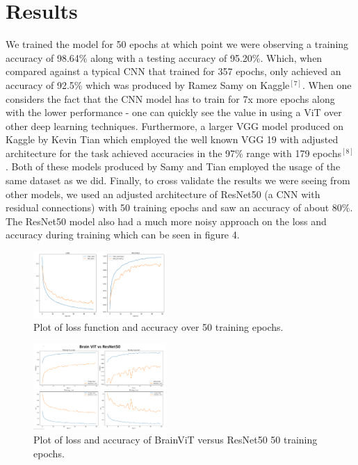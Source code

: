 \documentclass[conference]{IEEEtran}
\begin{document}
\section{Results}
We trained the model for 50 epochs at which point we were observing a training accuracy of 98.64\% along with a testing accuracy of 95.20\%. Which, when compared against a typical CNN that trained for 357 epochs, only achieved an accuracy of 92.5\% which was produced by Ramez Samy on Kaggle$^{[7]}$. When one considers the fact that the CNN model has to train for 7x more epochs along with the lower performance - one can quickly see the value in using a ViT over other deep learning techniques. Furthermore, a larger VGG model produced on Kaggle by Kevin Tian which employed the well known VGG 19 with adjusted architecture for the task achieved accuracies in the 97\% range with 179 epochs$^{[8]}$. Both of these models produced by Samy and Tian employed the usage of the same dataset as we did. Finally, to cross validate the results we were seeing from other models, we used an adjusted architecture of ResNet50 (a CNN with residual connections) with 50 training epochs and saw an accuracy of about 80\%. The ResNet50 model also had a much more noisy approach on the loss and accuracy during training which can be seen in figure 4.

\begin{figure}[htbp]
    \centering
    \includegraphics[width=0.45\textwidth]{lossacc over 50 epochs.PNG}
    \caption{Plot of loss function and accuracy over 50 training epochs.}
    \label{fig:2}
\end{figure}

\begin{figure}[htbp]
    \centering
    \includegraphics[width=0.45\textwidth]{resnet versus brainvit.PNG}
    \caption{Plot of loss and accuracy of BrainViT versus ResNet50 50 training epochs.}
    \label{fig:3}
\end{figure}
\end{document}
